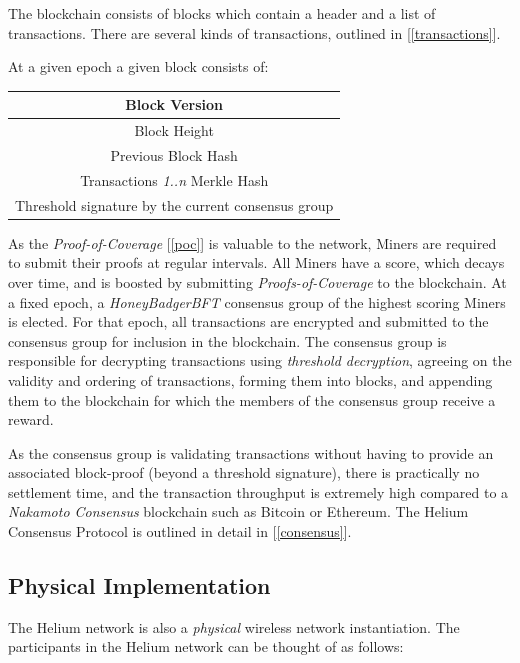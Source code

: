 \documentclass[10pt, nonatbib, nocopyrightspace, reprint]{sigplanconf}
\newcommand{\secref}[1]{[\autoref{#1}]}
\begin{document}
The blockchain consists of blocks which contain a header and a list of transactions. There are several kinds of transactions, outlined in \secref{transactions}.

At a given epoch a given block consists of:

\begin{center}
    \begin{tabular}{|c|}
         \hline
         Block Version \\
         \hline
         Block Height \\
         \hline
         Previous Block Hash \\
         \hline
         Transactions \emph{1..n} Merkle Hash \\
         \hline
         Threshold signature by the current consensus group \\
         \hline
    \end{tabular}
\end{center}

As the \emph{Proof-of-Coverage} \secref{poc} is valuable to the network, Miners are required to submit their proofs at regular intervals. All Miners have a score, which decays over time, and is boosted by submitting \emph{Proofs-of-Coverage} to the blockchain. At a fixed epoch, a \emph{HoneyBadgerBFT} \cite{honeybadger} consensus group of the highest scoring Miners is elected. For that epoch, all transactions are encrypted and submitted to the consensus group for inclusion in the blockchain. The consensus group is responsible for decrypting transactions using \emph{threshold decryption}, agreeing on the validity and ordering of transactions, forming them into blocks, and appending them to the blockchain for which the members of the consensus group receive a reward.

As the consensus group is validating transactions without having to provide an associated block-proof (beyond a threshold signature), there is practically no settlement time, and the transaction throughput is extremely high compared to a \emph{Nakamoto Consensus} blockchain such as Bitcoin or Ethereum. The Helium Consensus Protocol is outlined in detail in \secref{consensus}.

\subsection{Physical Implementation}

The Helium network is also a \emph{physical} wireless network instantiation. The participants in the Helium network can be thought of as follows:
\end{document}
